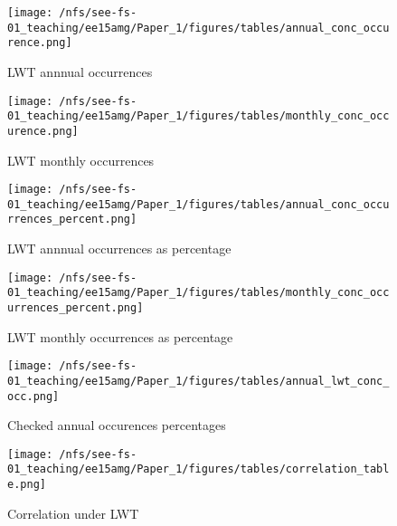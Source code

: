 \documentclass[10pt]{article}
\begin{document}
\begin{landscape}
\begin{figure}
	\texttt{[image: /nfs/see-fs-01\_teaching/ee15amg/Paper\_1/figures/tables/annual\_conc\_occurence.png]}
	\caption{LWT annnual occurrences}
\end{figure}

\begin{figure}
	\texttt{[image: /nfs/see-fs-01\_teaching/ee15amg/Paper\_1/figures/tables/monthly\_conc\_occurence.png]}
	\caption{LWT monthly occurrences}
\end{figure}

\pagebreak
\begin{figure}
	\texttt{[image: /nfs/see-fs-01\_teaching/ee15amg/Paper\_1/figures/tables/annual\_conc\_occurrences\_percent.png]}
	\caption{LWT annnual occurrences as percentage}
\end{figure}

\begin{figure}
	\texttt{[image: /nfs/see-fs-01\_teaching/ee15amg/Paper\_1/figures/tables/monthly\_conc\_occurrences\_percent.png]}
	\caption{LWT monthly occurrences as percentage}
\end{figure}


\begin{figure}
	\texttt{[image: /nfs/see-fs-01\_teaching/ee15amg/Paper\_1/figures/tables/annual\_lwt\_conc\_occ.png]}
	\caption{Checked annual occurences percentages}
\end{figure}



\begin{figure}
	\texttt{[image: /nfs/see-fs-01\_teaching/ee15amg/Paper\_1/figures/tables/correlation\_table.png]}
	\caption{Correlation under LWT}
\end{figure}
\end{landscape}
\end{document}
